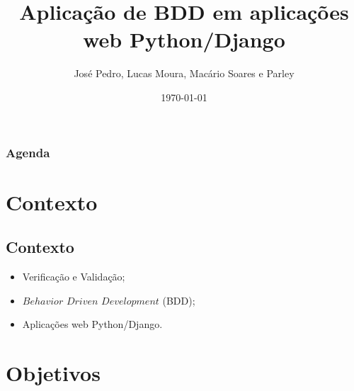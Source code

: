 \documentclass{beamer}
\title[Estudo de caso de BDD]{Aplicação de BDD em aplicações web Python/Django} %
\author{José Pedro, Lucas Moura, Macário Soares e Parley} %
\institute[UnB] %
{
Universidade de Brasília \\ %
\medskip
}
\date{\today} %
\begin{document}
\begin{frame}
\titlepage %
\end{frame}

\begin{frame}
\frametitle{Agenda} %
\tiny \begin{multicols}{2}
  \tableofcontents
\end{multicols}%
\end{frame}



\section{Contexto}
\subsection{Contexto}
\begin{frame}
  \begin{itemize}
      \item Verificação e Validação;    
      \item $Behavior$ $Driven$ $Development$ (BDD);
      \item Aplicações web Python/Django.
  \end{itemize}
\end{frame}

\section{Objetivos}
\end{document}
